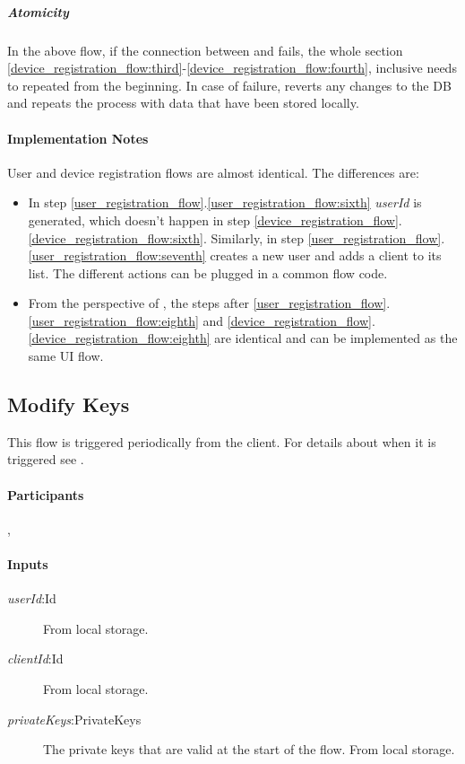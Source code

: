 \documentclass[a4paper,10pt]{article}
\newcommand{\privateKeys}{\emph{privateKeys}}
\newcommand{\userId}{\emph{userId}}
\newcommand{\clientId}{\emph{clientId}}
\begin{document}
\subparagraph{Atomicity}
In the above flow, if the connection between \Server{} and \Client{} fails, the whole section \ref{device_registration_flow:third}-\ref{device_registration_flow:fourth}, 
inclusive needs to repeated from the beginning. In case of failure, \Server{} reverts any changes to the DB and \Client{} repeats the process with data that have been stored locally.

\paragraph{Implementation Notes}
User and device registration flows are almost identical. The differences are:

\begin{itemize}
 \item In step \ref{user_registration_flow}.\ref{user_registration_flow:sixth} \userId{} is generated, which doesn't happen in step 
\ref{device_registration_flow}.\ref{device_registration_flow:sixth}. Similarly, in step \ref{user_registration_flow}.\ref{user_registration_flow:seventh} \Server{}
creates a new user and adds a client to its list. The different actions can be plugged in a common flow code.
 \item From the perspective of \Client{}, the steps after \ref{user_registration_flow}.\ref{user_registration_flow:eighth} and 
\ref{device_registration_flow}.\ref{device_registration_flow:eighth} are identical and can be implemented as the same UI flow.
\end{itemize}

\subsection{Modify Keys}
\label{modify_keys_flow}
This flow is triggered periodically from the client. For details about when it is triggered see \cite{crypto_spec}.

\paragraph{Participants} \Client{}, \Server{}

\paragraph{Inputs}
\SpecialItem
\begin{description}
 \item[\userId{}:Id] From \Client{} local storage.
 \item[\clientId{}:Id] From \Client{} local storage.
 \item[\privateKeys{}:PrivateKeys] The private keys that are valid at the start of the flow. From \Client{} local storage.
\end{description}
\end{document}
